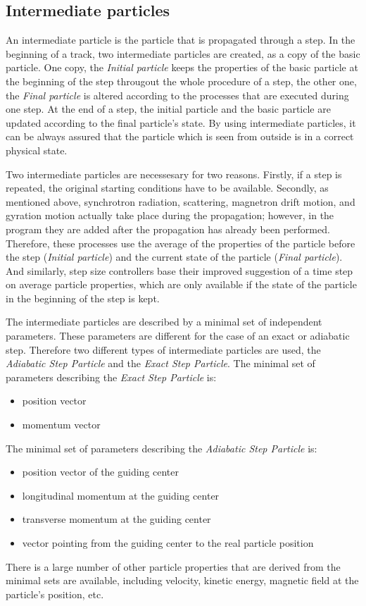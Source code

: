 \subsection{Intermediate particles}
\label{intermediateparticle}
An intermediate particle is the particle that is propagated through a step. In the beginning of a track, two intermediate particles are created, as a copy of the basic particle. One copy, the \textit{Initial particle} keeps the properties of the basic particle at the beginning of the step througout the whole procedure of a step, the other one, the \textit{Final particle} is altered according to the processes that are executed during one step. At the end of a step, the initial particle and the basic particle are updated according to the final particle's state. By using intermediate particles, it can be always assured that the particle which is seen from outside is in a correct physical state. 

Two intermediate particles are necessesary for two reasons. Firstly, if a step is repeated, the original starting conditions have to be available. Secondly, as mentioned above, synchrotron radiation, scattering, magnetron drift motion, and gyration motion actually take place during the propagation; however, in the program they are added after the propagation has already been performed. Therefore, these processes use the average of the properties of the particle before the step (\textit{Initial particle}) and the current state of the particle (\textit{Final particle}). And similarly, step size controllers base their improved suggestion of a time step on average particle properties, which are only available if the state of the particle in the beginning of the step is kept. 

The intermediate particles are described by a minimal set of independent parameters. These parameters are different for the case of an exact or adiabatic step. Therefore two different types of intermediate particles are used, the \textit{Adiabatic Step Particle} and the \textit{Exact Step Particle}. The minimal set of parameters describing the \textit{Exact Step Particle} is:
\begin {itemize}
    \item position vector
    \item momentum vector
\end {itemize}
The minimal set of parameters describing the \textit{Adiabatic Step Particle} is:
\begin {itemize}
    \item position vector of the guiding center 
    \item longitudinal momentum at the guiding center
    \item transverse momentum at the guiding center
    \item vector pointing from the guiding center to the real particle position
\end {itemize}
There is a large number of other particle properties that are derived from the minimal sets are available, including velocity, kinetic energy, magnetic field at the particle's position, etc.

